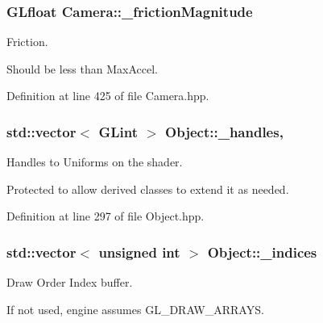 \hypertarget{class_camera_a66fb66da0ccd400c4986dc19276b6716}{
\subsubsection[{\-\_\-friction\-Magnitude}]{\setlength{\rightskip}{0pt plus 5cm}G\-Lfloat Camera\-::\-\_\-friction\-Magnitude\hspace{0.3cm}{\ttfamily [private]}}}\label{class_camera_a66fb66da0ccd400c4986dc19276b6716}


Friction. 

Should be less than Max\-Accel. 

Definition at line 425 of file Camera.\-hpp.

\hypertarget{class_object_a983963f564898beca4bda99676245663}{
\subsubsection[{\-\_\-handles}]{\setlength{\rightskip}{0pt plus 5cm}std\-::vector$<$ G\-Lint $>$ Object\-::\-\_\-handles\hspace{0.3cm}{\ttfamily [protected]}, {\ttfamily [inherited]}}}\label{class_object_a983963f564898beca4bda99676245663}


Handles to Uniforms on the shader. 

Protected to allow derived classes to extend it as needed. 

Definition at line 297 of file Object.\-hpp.

\hypertarget{class_object_ab85adc7a2d3b891051c096593982653d}{
\subsubsection[{\-\_\-indices}]{\setlength{\rightskip}{0pt plus 5cm}std\-::vector$<$ unsigned int $>$ Object\-::\-\_\-indices\hspace{0.3cm}{\ttfamily [inherited]}}}\label{class_object_ab85adc7a2d3b891051c096593982653d}


Draw Order Index buffer. 

If not used, engine assumes G\-L\-\_\-\-D\-R\-A\-W\-\_\-\-A\-R\-R\-A\-Y\-S. 

